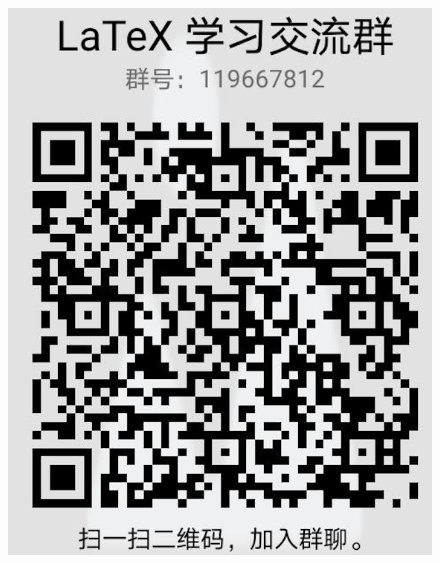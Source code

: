 \documentclass{libs/SUSTech_format}
\begin{document}

{
    \begin{frame}{}
        \centering
        \huge{\textbf{}}\\
        \begin{columns}
            \begin{figure}
                \includegraphics[scale=0.4]{latex_qq_group.png}
            \end{figure}


\end{columns}
\end{frame}}
\end{document}
